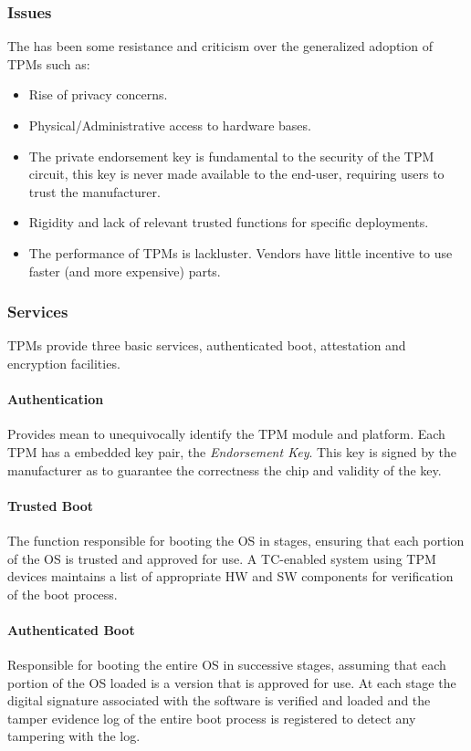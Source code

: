 \subsubsection{Issues}
The has been some resistance and criticism over the generalized adoption of TPMs such as:
\begin{itemize}
    \item Rise of privacy concerns.
    \item Physical/Administrative access to hardware bases.
    \item The private endorsement key is fundamental to the security of the TPM circuit,
    this key is never made available to the end-user, requiring users to trust the manufacturer.
    \item Rigidity and lack of relevant trusted functions for specific deployments.
    \item The performance of TPMs is lackluster.
    Vendors have little incentive to use faster (and more expensive) parts.
\end{itemize}

\subsubsection{Services}
TPMs provide three basic services, authenticated boot, attestation and encryption facilities.

\paragraph{Authentication}
Provides mean to unequivocally identify the TPM module and platform.
Each TPM has a embedded key pair, the \textit{Endorsement Key}.
This key is signed by the manufacturer as to guarantee the correctness the chip and validity of the key.

\paragraph{Trusted Boot}
The function responsible for booting the OS in stages,
ensuring that each portion of the OS is trusted and approved for use.
A TC-enabled system using TPM devices maintains a list of appropriate HW and SW components for verification of the boot process.

\paragraph{Authenticated Boot}
Responsible for booting the entire OS in successive stages,
assuming that each portion of the OS loaded is a version that is approved for use.
At each stage the digital signature associated with the software is verified and loaded and
the tamper evidence log of the entire boot process is registered to detect any tampering with the log.

